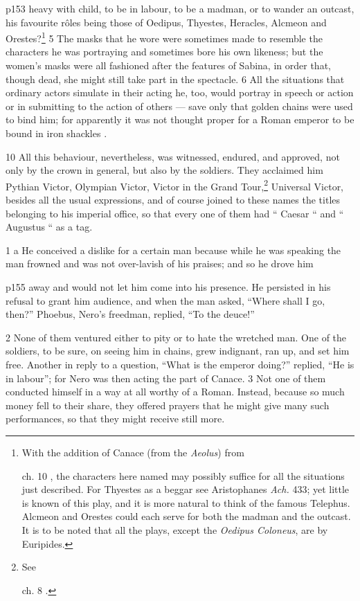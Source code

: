p153 heavy with child, to be in labour, to be a madman, or to wander an outcast, his favourite rôles being those of Oedipus, Thyestes, Heracles, Alcmeon and Orestes?\texthebrew{⁠}\footnote{With the addition of Canace (from the \emph{Aeolus}) from

ch. 10 , the characters here named may possibly suffice for all the situations just described. For Thyestes as a beggar see Aristophanes \emph{Ach.} 433; yet little is known of this play, and it is more natural to think of the famous Telephus. Alcmeon and Orestes could each serve for both the madman and the outcast. It is to be noted that all the plays, except the \emph{Oedipus Coloneus}, are by Euripides.

} 5 The masks that he wore were sometimes made to resemble the characters he was portraying and sometimes bore his own likeness; but the women's masks were all fashioned after the features of Sabina, in order that, though dead, she might still take part in the spectacle. 6 All the situations that ordinary actors simulate in their acting he, too, would portray in speech or action or in submitting to the action of others \texthebrew{—} save only that golden chains were used to bind him; for apparently it was not thought proper for a Roman emperor to be bound in iron shackles .

10
All this behaviour, nevertheless, was witnessed, endured, and approved, not only by the crown in general, but also by the soldiers. They acclaimed him Pythian Victor, Olympian Victor, Victor in the Grand Tour,\texthebrew{⁠}\footnote{See

ch. 8 .

} Universal Victor, besides all the usual expressions, and of course joined to these names the titles belonging to his imperial office, so that every one of them had `` Caesar `` and `` Augustus `` as a tag.

1 a He conceived a dislike for a certain man because while he was speaking the man frowned and was not over-lavish of his praises; and so he drove him

p155 away and would not let him come into his presence. He persisted in his refusal to grant him audience, and when the man asked, ``Where shall I go, then?'' Phoebus, Nero's freedman, replied, ``To the deuce!''

2
None of them ventured either to pity or to hate the wretched man. One of the soldiers, to be sure, on seeing him in chains, grew indignant, ran up, and set him free. Another in reply to a question, ``What is the emperor doing?'' replied, ``He is in labour''; for Nero was then acting the part of Canace. 3 Not one of them conducted himself in a way at all worthy of a Roman. Instead, because so much money fell to their share, they offered prayers that he might give many such performances, so that they might receive still more.

